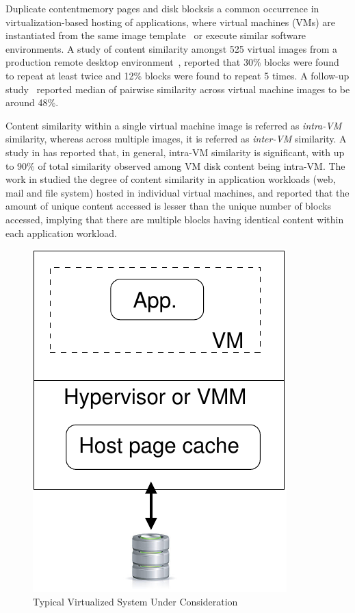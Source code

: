
Duplicate content\textemdash{}memory pages and disk blocks\textemdash{}is a common
occurrence in virtualization-based hosting of applications, where
virtual machines (VMs) are instantiated from the same image 
template~\cite{effectiveness} or execute similar software environments. 
A study of content similarity amongst 525
virtual images from a production remote desktop environment~\cite{similarity}, 
reported that
30\% blocks were found to repeat at least twice and 12\% blocks were
found to repeat 5 times. A follow-up study~\cite{vdn}
reported median of pairwise similarity across
virtual machine images to be around 48\%.

Content similarity within a single virtual machine image is referred
as \textit{intra-VM} similarity, whereas 
across multiple images, it is
referred as \textit{inter-VM} similarity.
A study in \cite{intra-higherthan-inter} has reported that, in general,
intra-VM similarity is significant, with up to 90\% of total similarity 
observed among VM disk content being intra-VM.
The work in \cite{iodedup} studied the degree of 
content similarity
in application workloads (web, mail and file system) hosted in 
individual virtual machines,
and reported that the amount of unique content accessed is lesser
than the unique number of blocks accessed, implying that there are multiple 
blocks having identical content within each application workload.

\begin{figure}[t]
\centering
\includegraphics[scale=0.65]{confided-figures/main/system-under-considerat.pdf}
\caption{Typical Virtualized System Under Consideration}
\label{fig:system-under-considerat}
\end{figure}

